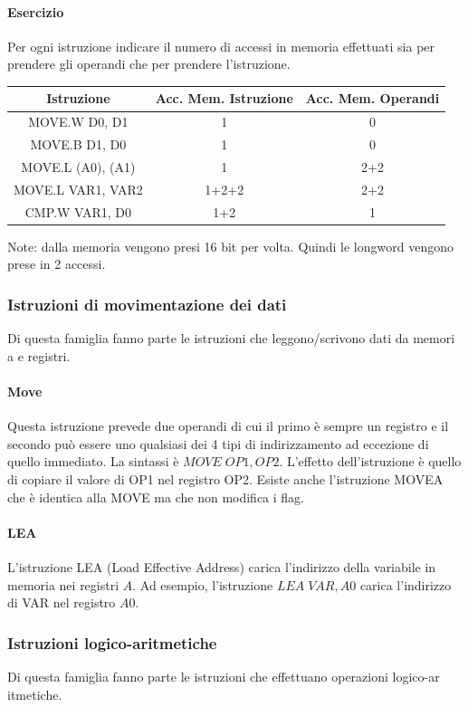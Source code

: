 \documentclass{article}
\begin{document}
\paragraph{Esercizio}
Per ogni istruzione indicare il numero di accessi in memoria effettuati sia
per prendere gli operandi che per prendere l'istruzione.


\begin{center}
\begin{tabular}{ ||c c c ||}
  \hline
  Istruzione & Acc. Mem. Istruzione & Acc. Mem. Operandi \\
  \hline \hline
  MOVE.W D0, D1 & 1 & 0 \\  
  MOVE.B D1, D0 & 1 & 0 \\  
  MOVE.L (A0), (A1) & 1 & 2+2 \\  
  MOVE.L VAR1, VAR2 & 1+2+2 & 2+2 \\  
  CMP.W VAR1, D0 & 1+2 & 1  \\   
  \hline
\end{tabular}
\end{center}
Note: dalla memoria vengono presi 16 bit per volta. Quindi le longword vengono 
prese in 2 accessi.

\subsubsection{Istruzioni di movimentazione dei dati}
Di questa famiglia fanno parte le istruzioni che leggono/scrivono dati da memori
a
e registri.

\paragraph{Move} Questa istruzione
prevede due operandi di cui
il primo è sempre un registro e il secondo può essere uno qualsiasi dei 4 tipi
di indirizzamento ad 
eccezione di quello immediato. La sintassi è $MOVE\;OP1,OP2$. 
L'effetto dell'istruzione è quello di copiare il valore di OP1 nel registro OP2.
Esiste anche l'istruzione MOVEA che è identica alla MOVE ma che non modifica i
flag.

\paragraph{LEA} L'istruzione LEA (Load Effective Address) carica l'indirizzo 
della variabile in memoria nei registri $A$. Ad esempio, l'istruzione $LEA\;VAR 
, A0$ carica l'indirizzo di VAR nel registro $A0$.

\subsubsection{Istruzioni logico-aritmetiche}
Di questa famiglia fanno parte le istruzioni che effettuano operazioni logico-ar
itmetiche.
\end{document}
